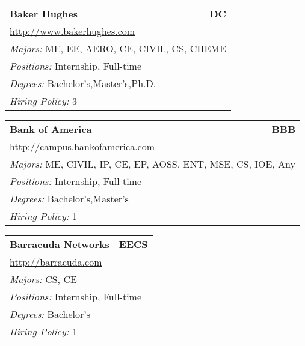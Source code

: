 \documentclass[twoside]{article}
\begin{document}
\begin{center}
\begin{multicols}{3}
\begin{FlushLeft}
\begin{minipage}{.9\columnwidth}
\end{minipage}
 
\begin{minipage}{.9\columnwidth}\begin{tabularx}{.95\columnwidth}{Xr}
                 {\Large\bf Baker Hughes} & {\Large\bf DC}\\
    \multicolumn{2}{p{.95\columnwidth}}{\url{http://www.bakerhughes.com}}\\
    \multicolumn{2}{p{.95\columnwidth}}{\emph{Majors:} ME, EE, AERO, CE, CIVIL, CS, CHEME}\\
    \multicolumn{2}{p{.95\columnwidth}}{\emph{Positions:} Internship, Full-time}\\
    \multicolumn{2}{p{.95\columnwidth}}{\emph{Degrees:} Bachelor's,Master's,Ph.D.}\\
    \multicolumn{2}{p{.95\columnwidth}}{\emph{Hiring Policy:} 3}\\
    \end{tabularx}
    
\end{minipage}
 
\begin{minipage}{.9\columnwidth}\begin{tabularx}{.95\columnwidth}{Xr}
                 {\Large\bf Bank of America} & {\Large\bf BBB}\\
    \multicolumn{2}{p{.95\columnwidth}}{\url{http://campus.bankofamerica.com}}\\
    \multicolumn{2}{p{.95\columnwidth}}{\emph{Majors:} ME, CIVIL, IP, CE, EP, AOSS, ENT, MSE, CS, IOE, Any}\\
    \multicolumn{2}{p{.95\columnwidth}}{\emph{Positions:} Internship, Full-time}\\
    \multicolumn{2}{p{.95\columnwidth}}{\emph{Degrees:} Bachelor's,Master's}\\
    \multicolumn{2}{p{.95\columnwidth}}{\emph{Hiring Policy:} 1}\\
    \end{tabularx}
    
\end{minipage}
 
\begin{minipage}{.9\columnwidth}\begin{tabularx}{.95\columnwidth}{Xr}
                 {\Large\bf Barracuda Networks} & {\Large\bf EECS}\\
    \multicolumn{2}{p{.95\columnwidth}}{\url{http://barracuda.com}}\\
    \multicolumn{2}{p{.95\columnwidth}}{\emph{Majors:} CS, CE}\\
    \multicolumn{2}{p{.95\columnwidth}}{\emph{Positions:} Internship, Full-time}\\
    \multicolumn{2}{p{.95\columnwidth}}{\emph{Degrees:} Bachelor's}\\
    \multicolumn{2}{p{.95\columnwidth}}{\emph{Hiring Policy:} 1}\\
    \end{tabularx}
    

\end{minipage}
\end{FlushLeft}
\end{multicols}
\end{center}
\end{document}

